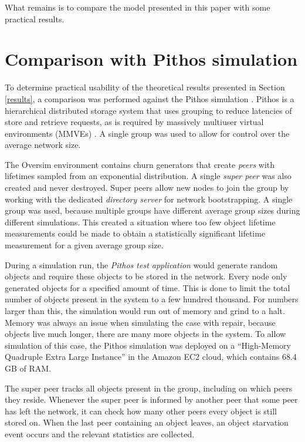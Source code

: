 \documentclass[10pt,a4paper,conference]{IEEEtran}
\begin{document}
What remains is to compare the model presented in this paper with some practical results.

\section{Comparison with Pithos simulation}
\label{simulation}

To determine practical usability of the theoretical results presented in Section \ref{results}, a comparison was performed against the Pithos simulation \cite{Pithos_mmve_2011}. Pithos is a hierarchical distributed storage system that uses grouping to reduce latencies of store and retrieve requests, as is required by massively multiuser virtual environments (MMVEs) \cite{gilmore_p2p_mmog_state_persistency}. A single group was used to allow for control over the average network size.

The Oversim environment contains churn generators that create \emph{peers} with lifetimes sampled from an exponential distribution. A single \emph{super peer} was also created and never destroyed. Super peers allow new nodes to join the group by working with the dedicated \emph{directory server} for network bootstrapping. A single group was used, because multiple groups have different average group sizes during different simulations. This created a situation where too few object lifetime measurements could be made to obtain a statistically significant lifetime measurement for a given average group size.

During a simulation run, the \emph{Pithos test application} would generate random objects and require these objects to be stored in the network. Every node only generated objects for a specified amount of time. This is done to limit the total number of objects present in the system to a few hundred thousand. For numbers larger than this, the simulation would run out of memory and grind to a halt. Memory was always an issue when simulating the case with repair, because objects live much longer, there are many more objects in the system. To allow simulation of this case, the Pithos simulation was deployed on a ``High-Memory Quadruple Extra Large Instance'' in the Amazon EC2 cloud, which contains 68.4 GB of RAM.

The super peer tracks all objects present in the group, including on which peers they reside. Whenever the super peer is informed by another peer that some peer has left the network, it can check how many other peers every object is still stored on. When the last peer containing an object leaves, an object starvation event occurs and the relevant statistics are collected.
\end{document}
